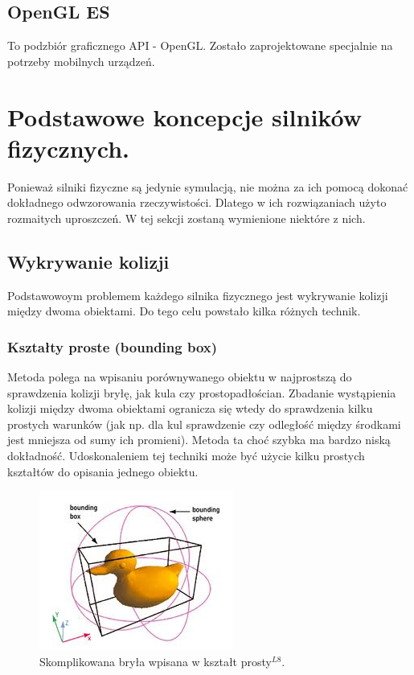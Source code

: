 \subsection{OpenGL ES}
To podzbiór graficznego API - OpenGL. Zostało zaprojektowane specjalnie na
potrzeby mobilnych urządzeń.

\newpage
\section{Podstawowe koncepcje silników fizycznych.}
Ponieważ silniki fizyczne są jedynie symulacją, nie można za ich pomocą dokonać
dokładnego odwzorowania rzeczywistości. Dlatego w ich rozwiązaniach użyto
rozmaitych uproszczeń. W tej sekcji zostaną wymienione niektóre z nich.

\subsection{Wykrywanie kolizji}
Podstawowoym problemem każdego silnika fizycznego jest wykrywanie kolizji między
dwoma obiektami. Do tego celu powstało kilka różnych technik.

\subsubsection{Kształty proste (bounding box)}
Metoda polega na wpisaniu porównywanego obiektu w najprostszą do sprawdzenia
kolizji bryłę, jak kula czy prostopadłościan. Zbadanie wystąpienia kolizji
między dwoma obiektami ogranicza się wtedy do sprawdzenia kilku prostych
warunków (jak np. dla kul sprawdzenie czy odległość między środkami jest
mniejsza od sumy ich promieni). Metoda ta choć szybka ma bardzo niską
dokładność. Udoskonaleniem tej techniki może być użycie kilku prostych kształtów
do opisania jednego obiektu.

\begin{figure}[H]
\centering
\includegraphics[scale=0.5]{./img/boundingBox.jpg}
\caption{Skomplikowana bryła wpisana w kształt prosty$ ^{L8} $.}
\label{fig:bbox}
\end{figure}

